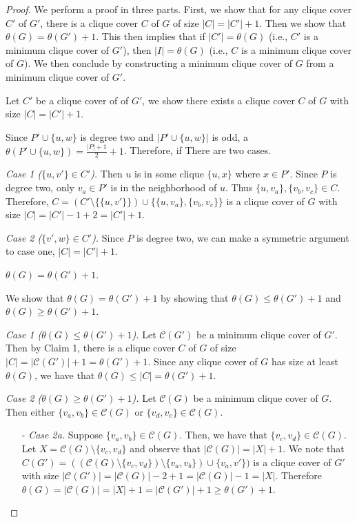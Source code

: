 \documentclass[../techreport.tex]{subfiles}
\begin{document}
\begin{proof}
	We perform a proof in three parts. First, we show that for any clique cover $C'$ of $G'$, there is a clique cover $C$ of $G$ of size $|C| = |C'| + 1$. Then we show that $\theta(G) = \theta(G') + 1$. This then implies that if $|C'| = \theta(G)$ (i.e., $C'$ is a minimum clique cover of $G'$), then $|I| = \theta(G)$ (i.e., $C$ is a minimum clique cover of $G$). We then conclude by constructing a minimum clique cover of $G$ from a minimum clique cover of $G'$.

	\begin{claim} 
		Let $C'$ be a clique cover of of $G'$, we show there exists a clique cover $C$ of $G$ with size $|C| = |C'| + 1$.
	\end{claim}
	Since $P' \cup \{u, w\}$ is degree two and $|P' \cup \{u, w\}|$ is odd, a $\theta(P' \cup \{u, w\}) = \frac{|P| + 1}{2} + 1$. Therefore, if There are two cases.

	\noindent\emph{Case 1 ($\{u, v'\} \in C'$).} Then $u$ is in some clique $\{u, x\}$ where $x \in P'$. Since $P$ is degree two, only $v_a \in P'$ is in the neighborhood of $u$. Thus $\{u, v_a\}, \{v_b, v_c\} \in C$. Therefore, $C = (C' \setminus \{\{u, v'\}\}) \cup \{\{u, v_a\}, \{v_b, v_c\}\}$ is a clique cover of $G$ with size $|C| = |C'| - 1 + 2 = |C'| + 1$.

	\noindent\emph{Case 2 ($\{v', w\} \in C'$).} Since $P$ is degree two, we can make a symmetric argument to case one, $|C| = |C'| + 1$.

	\begin{claim}
		$\theta(G) = \theta(G') + 1$.
	\end{claim}
	We show that $\theta(G) = \theta(G') + 1$ by showing that $\theta(G) \leq \theta(G') + 1$ and $\theta(G) \geq \theta(G') + 1$.

	\noindent\emph{Case 1 ($\theta(G) \leq \theta(G') + 1$).} Let $\mathcal{C}(G')$ be a minimum clique cover of $G'$. Then by Claim 1, there is a clique cover $C$ of $G$ of size $|C| = |\mathcal{C}(G')| + 1 = \theta(G') + 1$. Since any clique cover of $G$ has size at least $\theta(G)$, we have that $\theta(G) \leq |C| = \theta(G') + 1$. 

	\noindent\emph{Case 2 ($\theta(G) \geq \theta(G') + 1$).} Let $\mathcal{C}(G)$ be a minimum clique cover of $G$. Then either $\{v_a, v_b\} \in \mathcal{C}(G)$ or $\{v_d, v_e\} \in \mathcal{C}(G)$.
	\begin{itemize}
		\item[-]\emph{Case 2a.} Suppose $\{v_a, v_b\} \in \mathcal{C}(G)$. Then, we have that $\{v_c, v_d\} \in \mathcal{C}(G)$. Let $X = \mathcal{C}(G) \setminus \{v_c, v_d\}$ and observe that $|\mathcal{C}(G)| = |X| + 1$. We note that $C(G') = ((\mathcal{C}(G) \setminus \{v_c, v_d\}) \setminus \{v_a, v_b\}) \cup \{v_a, v'\})$ is a clique cover of $G'$ with size $|\mathcal{C}(G')| = |\mathcal{C}(G)| - 2 + 1 = |\mathcal{C}(G)| - 1 = |X|$. Therefore $\theta(G) = |\mathcal{C}(G)| = |X| + 1 = |\mathcal{C}(G')| + 1 \geq \theta(G') + 1$.


\end{itemize}
\end{proof}
\end{document}
